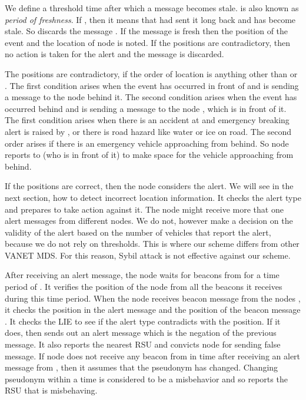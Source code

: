 \documentclass[conference]{IEEEtran}[10pt]
\begin{document}
We define a threshold time  after which a message becomes stale. 
 is also known as \emph{period of freshness}. 
If , then it means that  had sent it long back and has  become stale. 
So  discards the message . 
If the message is fresh then the position of the event  and the location of node  is noted. 
If the positions are contradictory, then no action is taken for the alert and the message is discarded. 

The positions are contradictory, if the order of location is anything other than 
 or . 
The first condition arises when the event has occurred in front of  and  is sending a message to the node  behind it. 
The second condition arises when the event has occurred  behind  and  is sending a message to the node , which is in front of it. 
The first condition arises when there is an accident at  and emergency breaking alert is raised by , 
or there is road hazard like water or ice on road. 
The second order arises if there is an emergency vehicle approaching from behind. 
So node  reports to  (who is in front of it) to make space for the vehicle approaching from behind. 
 
If the positions are correct, then the node  considers the alert.
We will see in the next section, how to detect incorrect location information. 
It checks the alert type and prepares to take action against it. 
The node  might receive more that one alert messages from different nodes.
We do not, however make a decision on the validity of the alert based on the number of vehicles 
that report the alert, because we do not rely on thresholds.
This is where our scheme differs from other VANET MDS. 
For this reason, Sybil attack is not effective against our scheme. 

After receiving an alert message, the node  waits for beacons from  for a  time period of . 
It verifies the position of the node  from all the beacons it receives during this time period. 
When the node   receives beacon message from the nodes , 
it checks the position  in the alert message
and the position  of the beacon message . 
It checks the LIE to see if the alert type contradicts with the position. 
If it does, then  sends out an alert message which is the negation of the previous message. 
It also reports the nearest RSU and convicts node  for sending false message. 
If node  does not receive any beacon from  in time  after receiving an alert message from , 
then it assumes that the pseudonym has changed.
Changing pseudonym within a time  is considered to be a misbehavior and so  reports the RSU that  is misbehaving. 
\end{document}
